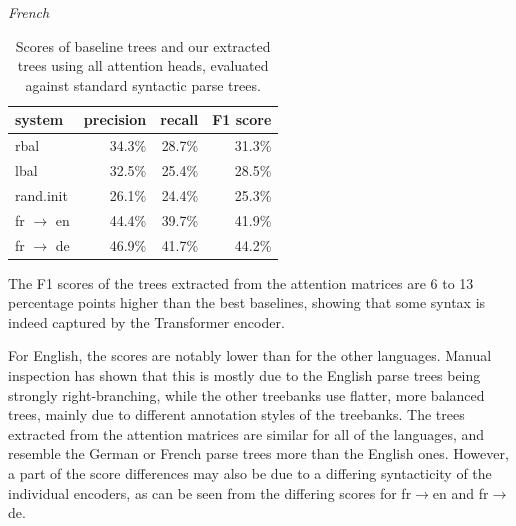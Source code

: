 \documentclass[11pt,a4paper]{article}
\def\RR#1{{\color{blue}RR: \it #1}}
\def\JL#1{{\color{magenta}JL: \it #1}}
\def\JL#1{}
\def\RR#1{}
\begin{document}
\begin{table}[t]
\emph{French}
\begin{tabular}{l|rrr}
system & precision & recall & F1 score \\
\hline
rbal     & 34.3\% & 28.7\%	& 31.3\% \\
lbal     & 32.5\% & 25.4\%	& 28.5\% \\
rand.init& 26.1\% & 24.4\%	& 25.3\% \\
\hline
fr $\rightarrow$ en & 44.4\% & 39.7\% & 41.9\% \\
fr $\rightarrow$ de & 46.9\% & 41.7\% & 44.2\% \\
\end{tabular}
\caption{Scores of baseline trees and our extracted trees using all attention heads, evaluated against standard syntactic parse trees.}
\label{tab:results}
\end{table}

The F1 scores of the trees extracted from the attention matrices are 6 to 13 percentage points higher than the best baselines, showing that some syntax
is
indeed captured by the Transformer encoder.

For English, the scores are notably lower than for the other languages.
Manual inspection has shown that this is mostly due to the English parse trees being strongly right-branching, while the other treebanks use flatter, more balanced trees, mainly due to different annotation styles of the treebanks.
The trees extracted from the attention matrices are similar for all of the languages, and resemble the German or French parse trees more than the English ones.
However, a part of the score differences may also be due to a differing syntacticity of the individual encoders, as can be seen from the differing scores for fr$\rightarrow$en and fr$\rightarrow$de.

\end{document}
